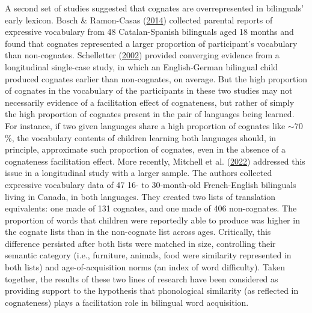 \documentclass[
]{article}
\begin{document}
A second set of studies suggested that cognates are overrepresented in
bilinguals' early lexicon. Bosch \& Ramon-Casas
(\protect\hyperlink{ref-bosch2014first}{2014}) collected parental
reports of expressive vocabulary from 48 Catalan-Spanish bilinguals aged
18 months and found that cognates represented a larger proportion of
participant's vocabulary than non-cognates. Schelletter
(\protect\hyperlink{ref-schelletter2002effect}{2002}) provided
converging evidence from a longitudinal single-case study, in which an
English-German bilingual child produced cognates earlier than
non-cognates, on average. But the high proportion of cognates in the
vocabulary of the participants in these two studies may not necessarily
evidence of a facilitation effect of cognateness, but rather of simply
the high proportion of cognates present in the pair of languages being
learned. For instance, if two given languages share a high proportion of
cognates like \(\sim 70\)\%, the vocabulary contents of children
learning both languages should, in principle, approximate such
proportion of cognates, even in the absence of a cognateness
facilitation effect. More recently, Mitchell et al.
(\protect\hyperlink{ref-mitchell2022cognates}{2022}) addressed this
issue in a longitudinal study with a larger sample. The authors
collected expressive vocabulary data of 47 16- to 30-month-old
French-English bilinguals living in Canada, in both languages. They
created two lists of translation equivalents: one made of 131 cognates,
and one made of 406 non-cognates. The proportion of words that children
were reportedly able to produce was higher in the cognate lists than in
the non-cognate list across ages. Critically, this difference persisted
after both lists were matched in size, controlling their semantic
category (i.e., furniture, animals, food were similarity represented in
both lists) and age-of-acquisition norms (an index of word difficulty).
Taken together, the results of these two lines of research have been
considered as providing support to the hypothesis that phonological
similarity (as reflected in cognateness) plays a facilitation role in
bilingual word acquisition.
\end{document}
